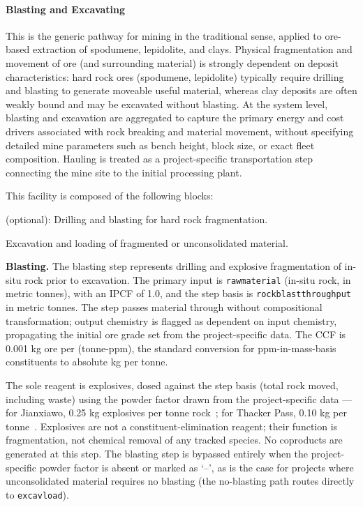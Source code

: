 \documentclass{article}
\renewcommand\_{\textunderscore\allowbreak}
\begin{document}
\paragraph{Blasting and Excavating}\label{app:04-methods-facilitychoices-blastexcav}\leavevmode\par

This is the generic pathway for mining in the traditional sense, applied to ore-based extraction of spodumene, lepidolite, and clays. Physical fragmentation and movement of ore (and surrounding material) is strongly dependent on deposit characteristics: hard rock ores (spodumene, lepidolite) typically require drilling and blasting to generate moveable useful material, whereas clay deposits are often weakly bound and may be excavated without blasting. At the system level, blasting and excavation are aggregated to capture the primary energy and cost drivers associated with rock breaking and material movement, without specifying detailed mine parameters such as bench height, block size, or exact fleet composition. Hauling is treated as a project-specific transportation step connecting the mine site to the initial processing plant.

This facility is composed of the following blocks:

\begin{description}[noitemsep, topsep=0pt]
    \item[\textbullet\enskip\texttt{Blasting}] (optional): Drilling and blasting for hard rock fragmentation.
    \item[\textbullet\enskip\texttt{Excavation/Loading:}] Excavation and loading of fragmented or unconsolidated material.
\end{description}

\medskip
\noindent\textbf{Blasting.}\quad
The blasting step represents drilling and explosive fragmentation of in-situ rock prior to excavation. The primary input is \texttt{raw\_material} (in-situ rock, in metric tonnes), with an IPCF of 1.0, and the step basis is \texttt{rock\_blast\_throughput} in metric tonnes. The step passes material through without compositional transformation; output chemistry is flagged as dependent on input chemistry, propagating the initial ore grade set from the project-specific data. The CCF is 0.001 kg ore per (tonne-ppm), the standard conversion for ppm-in-mass-basis constituents to absolute kg per tonne.

The sole reagent is explosives, dosed against the step basis (total rock moved, including waste) using the powder factor drawn from the project-specific data --- for Jianxiawo, 0.25 kg explosives per tonne rock~\cite{darlingSMEMiningEngineering2011}; for Thacker Pass, 0.10 kg per tonne~\cite{sgscanadaincSK1300Technical2024}. Explosives are not a constituent-elimination reagent; their function is fragmentation, not chemical removal of any tracked species. No coproducts are generated at this step. The blasting step is bypassed entirely when the project-specific powder factor is absent or marked as `--', as is the case for projects where unconsolidated material requires no blasting (the no-blasting path routes directly to \texttt{excav\_load}).
\end{document}
